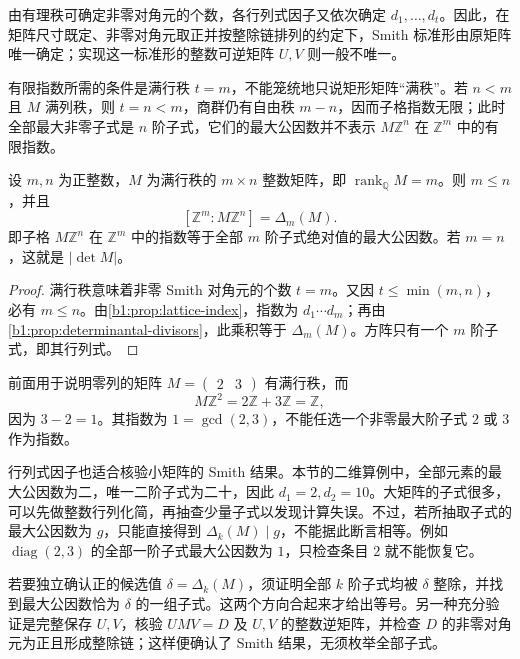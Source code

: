 由有理秩可确定非零对角元的个数，各行列式因子又依次确定 \(d_1,\ldots,d_t\)。因此，在矩阵尺寸既定、非零对角元取正并按整除链排列的约定下，Smith 标准形由原矩阵唯一确定；实现这一标准形的整数可逆矩阵 \(U,V\) 则一般不唯一。

\ProseParagraphBreak
有限指数所需的条件是满行秩 \(t=m\)，不能笼统地只说矩形矩阵“满秩”。若 \(n<m\) 且 \(M\) 满列秩，则 \(t=n<m\)，商群仍有自由秩 \(m-n\)，因而子格指数无限；此时全部最大非零子式是 \(n\) 阶子式，它们的最大公因数并不表示 \(M\mathbb Z^n\) 在 \(\mathbb Z^m\) 中的有限指数。

\begin{corollary}[满行秩矩形矩阵的子格指数]\label{b1:cor:full-row-rank-index}
	设 \(m,n\) 为正整数，\(M\) 为满行秩的 \(m\times n\) 整数矩阵，即 \(\operatorname{rank}_{\mathbb Q}M=m\)。则 \(m\le n\)，并且
	\[
		[\mathbb Z^m:M\mathbb Z^n]=\Delta_m(M).
	\]
	即子格 \(M\mathbb Z^n\) 在 \(\mathbb Z^m\) 中的指数等于全部 \(m\) 阶子式绝对值的最大公因数。若 \(m=n\)，这就是 \(|\det M|\)。
\end{corollary}

\begin{proof}
	满行秩意味着非零 Smith 对角元的个数 \(t=m\)。又因 \(t\leq\min(m,n)\)，必有 \(m\leq n\)。由\cref{b1:prop:lattice-index}，指数为 \(d_1\cdots d_m\)；再由\cref{b1:prop:determinantal-divisors}，此乘积等于 \(\Delta_m(M)\)。方阵只有一个 \(m\) 阶子式，即其行列式。
\end{proof}

前面用于说明零列的矩阵 \(M=\begin{pmatrix}2&3\end{pmatrix}\) 有满行秩，而
\[
	M\mathbb Z^2=2\mathbb Z+3\mathbb Z=\mathbb Z,
\]
因为 \(3-2=1\)。其指数为 \(1=\gcd(2,3)\)，不能任选一个非零最大阶子式 \(2\) 或 \(3\) 作为指数。

\ProseParagraphBreak
行列式因子也适合核验小矩阵的 Smith 结果。本节的二维算例中，全部元素的最大公因数为二，唯一二阶子式为二十，因此 \(d_1=2,d_2=10\)。大矩阵的子式很多，可以先做整数行列化简，再抽查少量子式以发现计算失误。不过，若所抽取子式的最大公因数为 \(g\)，只能直接得到 \(\Delta_k(M)\mid g\)，不能据此断言相等。例如 \(\operatorname{diag}(2,3)\) 的全部一阶子式最大公因数为 \(1\)，只检查条目 \(2\) 就不能恢复它。

\ProseParagraphBreak
若要独立确认正的候选值 \(\delta=\Delta_k(M)\)，须证明全部 \(k\) 阶子式均被 \(\delta\) 整除，并找到最大公因数恰为 \(\delta\) 的一组子式。这两个方向合起来才给出等号。另一种充分验证是完整保存 \(U,V\)，核验 \(UMV=D\) 及 \(U,V\) 的整数逆矩阵，并检查 \(D\) 的非零对角元为正且形成整除链；这样便确认了 Smith 结果，无须枚举全部子式。


